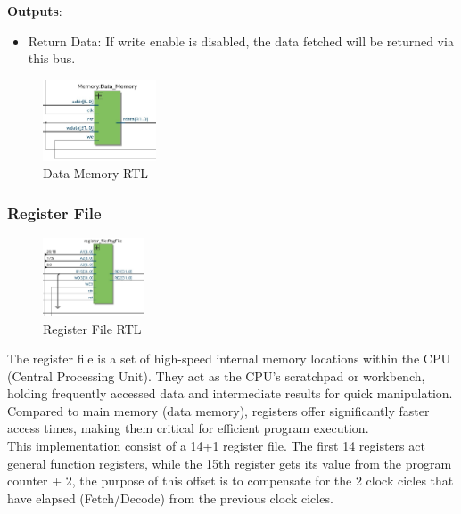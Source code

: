 \documentclass[9pt,a4paper,twoside]{tau}
\begin{document}
    \textbf{Outputs}:
    \begin{itemize}
        \item Return Data: If write enable is disabled, the data fetched will be returned via this bus.
    \end{itemize}


    \begin{figure}[h]  %
        \centering  %
        \includegraphics[width=0.3\textwidth]{images/DataMemImg.png}
        \caption{Data Memory RTL}
        \label{fig:Data Memory RTL}
    \end{figure}


\subsubsection{Register File}


\begin{figure}[h]  %
    \centering  %
    \includegraphics[width=0.27\textwidth]{images/RegFileImg.png}
    \caption{Register File RTL}
    \label{fig:Register File RTL}
\end{figure}


    The register file is a set of high-speed internal memory locations within the CPU (Central Processing Unit).  They act as the CPU's scratchpad or workbench, holding frequently accessed data and intermediate results for quick manipulation. Compared to main memory (data memory), registers offer significantly faster access times, making them critical for efficient program execution. \\
    This implementation consist of a 14+1 register file. The first 14 registers act general function registers, while the 15th register gets its value from the program counter + 2, the purpose of this offset is to compensate for the 2 clock cicles that have elapsed (Fetch/Decode) from the previous clock cicles.
\end{document}
